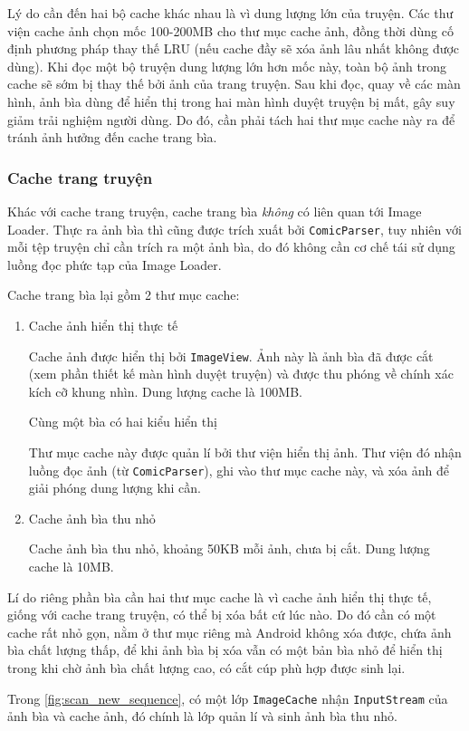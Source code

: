 \documentclass[../../../../thesis]{subfiles}
\begin{document}
Lý do cần đến hai bộ cache khác nhau là vì dung lượng lớn của truyện. Các thư
viện cache ảnh chọn mốc 100-200MB cho thư mục cache ảnh, đồng thời dùng cố định
phương pháp thay thế LRU (nếu cache đầy sẽ xóa ảnh lâu nhất không được dùng).
Khi đọc một bộ truyện dung lượng lớn hơn mốc này, toàn bộ ảnh trong cache sẽ sớm
bị thay thế bởi ảnh của trang truyện. Sau khi đọc, quay về các màn hình, ảnh bìa
dùng để hiển thị trong hai màn hình duyệt truyện bị mất, gây suy giảm trải
nghiệm người dùng. Do đó, cần phải tách hai thư mục cache này ra để tránh ảnh
hưởng đến cache trang bìa.

\subsubsection{Cache trang truyện}

Khác với cache trang truyện, cache trang bìa \emph{không} có liên quan tới Image
Loader. Thực ra ảnh bìa thì cũng được trích xuất bởi \texttt{ComicParser}, tuy
nhiên với mỗi tệp truyện chỉ cần trích ra một ảnh bìa, do đó không cần cơ chế
tái sử dụng luồng đọc phức tạp của Image Loader.

Cache trang bìa lại gồm 2 thư mục cache:

\begin{enumerate}
    \item
        Cache ảnh hiển thị thực tế

        Cache ảnh được hiển thị bởi \texttt{ImageView}. Ảnh này là ảnh bìa đã
        được cắt (xem phần thiết kế màn hình duyệt truyện) và được thu phóng về
        chính xác kích cỡ khung nhìn. Dung lượng cache là 100MB.

        Cùng một bìa có hai kiểu hiển thị

        Thư mục cache này được quản lí bởi thư viện hiển thị ảnh. Thư viện đó
        nhận luồng đọc ảnh (từ \texttt{ComicParser}), ghi vào thư mục cache này,
        và xóa ảnh để giải phóng dung lượng khi cần.
    \item
        Cache ảnh bìa thu nhỏ

        Cache ảnh bìa thu nhỏ, khoảng 50KB mỗi ảnh, chưa bị cắt. Dung lượng
        cache là 10MB.
\end{enumerate}

Lí do riêng phần bìa cần hai thư mục cache là vì cache ảnh hiển thị thực tế,
giống với cache trang truyện, có thể bị xóa bất cứ lúc nào. Do đó cần có một
cache rất nhỏ gọn, nằm ở thư mục riêng mà Android không xóa được, chứa ảnh bìa
chất lượng thấp, để khi ảnh bìa bị xóa vẫn có một bản bìa nhỏ để hiển thị trong
khi chờ ảnh bìa chất lượng cao, có cắt cúp phù hợp được sinh lại.

Trong \autoref{fig:scan_new_sequence}, có một lớp \texttt{ImageCache} nhận
\texttt{InputStream} của ảnh bìa và cache ảnh, đó chính là lớp quản lí và sinh
ảnh bìa thu nhỏ.
\end{document}
